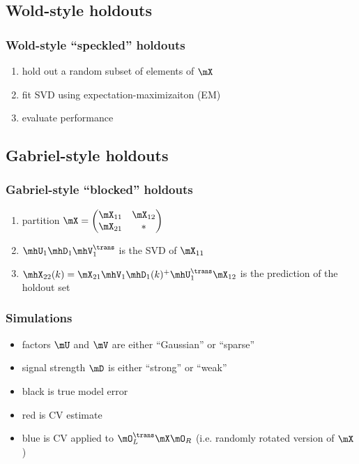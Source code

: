 \documentclass[14pt]{beamer}
\begin{document}
\subsection{Wold-style holdouts}

\begin{frame}
  \frametitle{Wold-style ``speckled'' holdouts}
  \begin{enumerate}
    \item hold out a random subset of elements of $\mX$
    \item fit SVD using expectation-maximizaiton (EM)
    \item evaluate performance
  \end{enumerate}
\end{frame}

\subsection{Gabriel-style holdouts}

\begin{frame}
  \frametitle{Gabriel-style ``blocked'' holdouts}
  \begin{enumerate}
    \item partition
    \(
      \mX = \left(\begin{matrix} \mX_{11} & \mX_{12} \\ \mX_{21} & \ast \end{matrix}\right)
    \)
    \item $\mhU_1 \mhD_1 \mhV_1^\trans$ is the SVD of $\mX_{11}$
    \item $\mhX_{22}(k) = \mX_{21} \mhV_1 \mhD_1(k)^+ \mhU_1^\trans \mX_{12}$ is the prediction of the holdout set
  \end{enumerate}
\end{frame}

\begin{frame}
  \frametitle{Simulations}
  \begin{itemize}
    \item factors $\mU$ and $\mV$ are either ``Gaussian'' or ``sparse''
    \item signal strength $\mD$ is either ``strong'' or ``weak''
    \item black is true model error
    \item red is CV estimate
    \item blue is CV applied to $\mO_L^\trans \mX \mO_R$ (i.e. randomly rotated version of $\mX$) 
  \end{itemize}
\end{frame}
\end{document}
